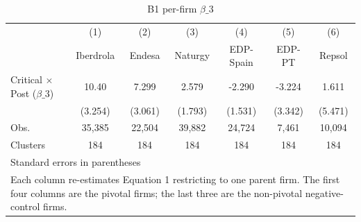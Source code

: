 \begin{table}[htbp]\centering
\caption{B1 per-firm $\beta\_3$}
\begin{tabular}{l*{6}{c}}
\toprule
                    &\multicolumn{1}{c}{(1)}&\multicolumn{1}{c}{(2)}&\multicolumn{1}{c}{(3)}&\multicolumn{1}{c}{(4)}&\multicolumn{1}{c}{(5)}&\multicolumn{1}{c}{(6)}\\
                    &\multicolumn{1}{c}{Iberdrola}&\multicolumn{1}{c}{Endesa}&\multicolumn{1}{c}{Naturgy}&\multicolumn{1}{c}{EDP-Spain}&\multicolumn{1}{c}{EDP-PT}&\multicolumn{1}{c}{Repsol}\\
\midrule
Critical $\times$ Post ($\beta\_3$)&       10.40&       7.299&       2.579&      -2.290&      -3.224&       1.611\\
                    &     (3.254)&     (3.061)&     (1.793)&     (1.531)&     (3.342)&     (5.471)\\
\midrule
Obs.                &      35,385&      22,504&      39,882&      24,724&       7,461&      10,094\\
Clusters            &         184&         184&         184&         184&         184&         184\\
\bottomrule
\multicolumn{7}{l}{\footnotesize Standard errors in parentheses}\\
\multicolumn{7}{l}{\footnotesize Each column re-estimates Equation 1 restricting to one parent firm. The first four columns are the pivotal firms; the last three are the non-pivotal negative-control firms.}\\
\end{tabular}
\end{table}
